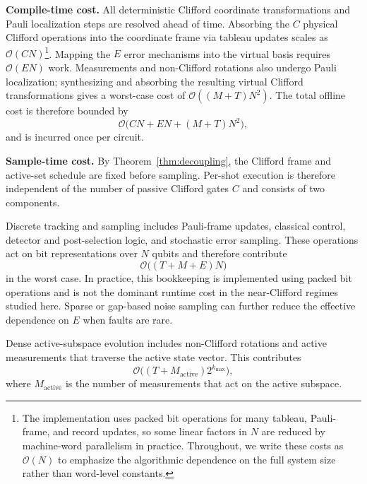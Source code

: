 \documentclass[a4paper, onecolumn, unpublished]{quantumarticle}
\begin{document}
    \textbf{Compile-time cost.}
    All deterministic Clifford coordinate transformations and Pauli localization steps are resolved ahead of time. Absorbing the $C$ physical Clifford operations into the coordinate frame via tableau updates scales as $\mathcal{O}(CN)$\footnote{The implementation uses packed bit operations for many tableau, Pauli-frame, and record updates, so some linear factors in $N$ are reduced by machine-word parallelism in practice. Throughout, we write these costs as $\mathcal{O}(N)$ to emphasize the algorithmic dependence on the full system size rather than word-level constants.}. Mapping the $E$ error mechanisms into the virtual basis requires $\mathcal{O}(EN)$ work. Measurements and non-Clifford rotations also undergo Pauli localization; synthesizing and absorbing the resulting virtual Clifford transformations gives a worst-case cost of $\mathcal{O}((M+T)N^2)$. The total offline cost is therefore bounded by
    \begin{equation}
        \mathcal{O}\bigl(CN + EN + (M+T)N^2\bigr),
    \end{equation}
    and is incurred once per circuit.

    \textbf{Sample-time cost.}
    By Theorem~\ref{thm:decoupling}, the Clifford frame and active-set schedule are fixed before sampling. Per-shot execution is therefore independent of the number of passive Clifford gates $C$ and consists of two components.

    Discrete tracking and sampling includes Pauli-frame updates, classical control, detector and post-selection logic, and stochastic error sampling. These operations act on bit representations over $N$ qubits and therefore contribute
    \begin{equation}
        \mathcal{O}\bigl((T + M + E)N\bigr)
    \end{equation}
    in the worst case. In practice, this bookkeeping is implemented using packed bit operations and is not the dominant runtime cost in the near-Clifford regimes studied here. Sparse or gap-based noise sampling can further reduce the effective dependence on $E$ when faults are rare.

    Dense active-subspace evolution includes non-Clifford rotations and active measurements that traverse the active state vector. This contributes
    \begin{equation}
        \mathcal{O}\bigl((T + M_{\mathrm{active}})2^{k_{\max}}\bigr),
    \end{equation}
    where $M_{\mathrm{active}}$ is the number of measurements that act on the active subspace.
\end{document}
